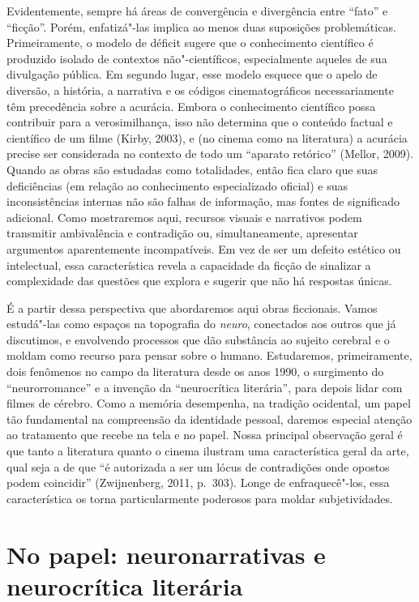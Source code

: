 Evidentemente, sempre há áreas de convergência e divergência entre
``fato'' e ``ficção''. Porém, enfatizá"-las implica ao menos duas
suposições problemáticas. Primeiramente, o modelo de déficit sugere que
o conhecimento científico é produzido isolado de contextos
não"-científicos, especialmente aqueles de sua divulgação pública. Em
segundo lugar, esse modelo esquece que o apelo de diversão, a história,
a narrativa e os códigos cinematográficos necessariamente têm
precedência sobre a acurácia. Embora o conhecimento científico possa
contribuir para a verosimilhança, isso não determina que o conteúdo
factual e científico de um filme (Kirby, 2003), e (no cinema como na
literatura) a acurácia precise ser considerada no contexto de todo um
``aparato retórico'' (Mellor, 2009). Quando as obras são estudadas como
totalidades, então fica claro que suas deficiências (em relação ao
conhecimento especializado oficial) e suas inconsistências internas não
são falhas de informação, mas fontes de significado adicional. Como
mostraremos aqui, recursos visuais e narrativos podem transmitir
ambivalência e contradição ou, simultaneamente, apresentar argumentos
aparentemente incompatíveis. Em vez de ser um defeito estético ou
intelectual, essa característica revela a capacidade da ficção de
sinalizar a complexidade das questões que explora e sugerir que não há
respostas únicas.

É a partir dessa perspectiva que abordaremos aqui obras ficcionais.
Vamos estudá"-las como espaços na topografia do \emph{neuro}, conectados
aos outros que já discutimos, e envolvendo processos que dão substância
ao sujeito cerebral e o moldam como recurso para pensar sobre o humano.
Estudaremos, primeiramente, dois fenômenos no campo da literatura desde
os anos 1990, o surgimento do ``neurorromance'' e a invenção da
``neurocrítica literária'', para depois lidar com filmes de cérebro.
Como a memória desempenha, na tradição ocidental, um papel tão
fundamental na compreensão da identidade pessoal, daremos especial
atenção ao tratamento que recebe na tela e no papel. Nossa principal
observação geral é que tanto a literatura quanto o cinema ilustram uma
característica geral da arte, qual seja a de que ``é autorizada a ser um
lócus de contradições onde opostos podem coincidir'' (Zwijnenberg, 2011,
p.~303). Longe de enfraquecê"-los, essa característica os torna
particularmente poderosos para moldar subjetividades.

\chapter{No papel: neuronarrativas e neurocrítica literária}


